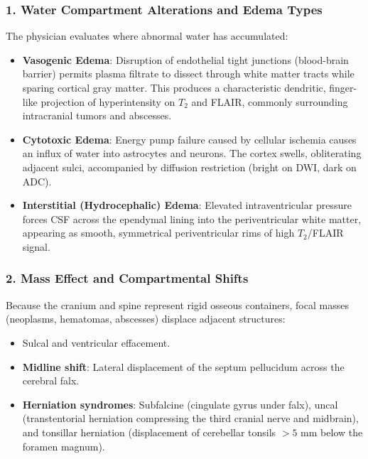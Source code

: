 \documentclass[11pt,a4paper]{article}
\begin{document}
\subsubsection{1. Water Compartment Alterations and Edema Types}
The physician evaluates where abnormal water has accumulated:
\begin{itemize}
    \item \textbf{Vasogenic Edema}: Disruption of endothelial tight junctions (blood-brain barrier) permits plasma filtrate to dissect through white matter tracts while sparing cortical gray matter. This produces a characteristic dendritic, finger-like projection of hyperintensity on $T_2$ and FLAIR, commonly surrounding intracranial tumors and abscesses.
    \item \textbf{Cytotoxic Edema}: Energy pump failure caused by cellular ischemia causes an influx of water into astrocytes and neurons. The cortex swells, obliterating adjacent sulci, accompanied by diffusion restriction (bright on DWI, dark on ADC).
    \item \textbf{Interstitial (Hydrocephalic) Edema}: Elevated intraventricular pressure forces CSF across the ependymal lining into the periventricular white matter, appearing as smooth, symmetrical periventricular rims of high $T_2$/FLAIR signal.
\end{itemize}

\subsubsection{2. Mass Effect and Compartmental Shifts}
Because the cranium and spine represent rigid osseous containers, focal masses (neoplasms, hematomas, abscesses) displace adjacent structures:
\begin{itemize}
    \item Sulcal and ventricular effacement.
    \item \textbf{Midline shift}: Lateral displacement of the septum pellucidum across the cerebral falx.
    \item \textbf{Herniation syndromes}: Subfalcine (cingulate gyrus under falx), uncal (transtentorial herniation compressing the third cranial nerve and midbrain), and tonsillar herniation (displacement of cerebellar tonsils $>5\text{ mm}$ below the foramen magnum).
\end{itemize}
\end{document}
